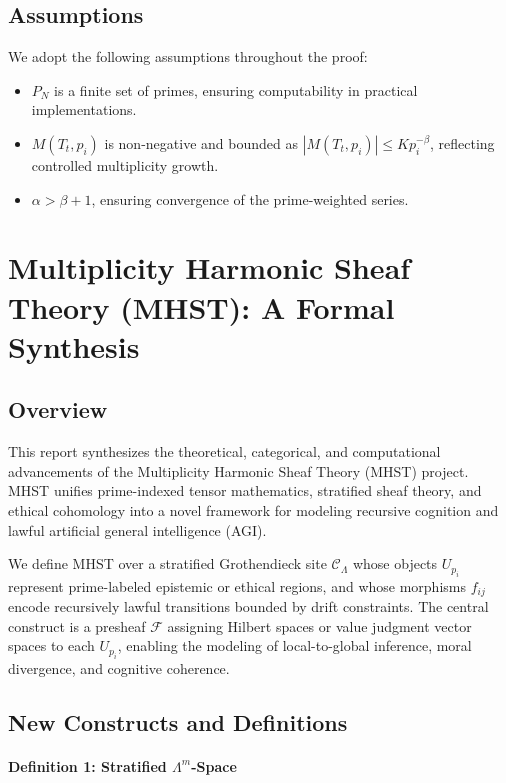 \documentclass{article}
\theoremstyle{plain}
\begin{document}
\subsection{Assumptions}
We adopt the following assumptions throughout the proof:
\begin{itemize}
    \item \( P_N \) is a finite set of primes, ensuring computability in practical implementations.
    \item \( M(T_t, p_i) \) is non-negative and bounded as \( |M(T_t, p_i)| \leq K p_i^{-\beta} \), reflecting controlled multiplicity growth.
    \item \( \alpha > \beta + 1 \), ensuring convergence of the prime-weighted series.
\end{itemize}


\section{Multiplicity Harmonic Sheaf Theory (MHST): A Formal Synthesis}

\subsection{Overview}

This report synthesizes the theoretical, categorical, and computational advancements of the Multiplicity Harmonic Sheaf Theory (MHST) project. MHST unifies prime-indexed tensor mathematics, stratified sheaf theory, and ethical cohomology into a novel framework for modeling recursive cognition and lawful artificial general intelligence (AGI).

We define MHST over a stratified Grothendieck site $\mathcal{C}_\Lambda$ whose objects $U_{p_i}$ represent prime-labeled epistemic or ethical regions, and whose morphisms $f_{ij}$ encode recursively lawful transitions bounded by drift constraints. The central construct is a presheaf $\mathcal{F}$ assigning Hilbert spaces or value judgment vector spaces to each $U_{p_i}$, enabling the modeling of local-to-global inference, moral divergence, and cognitive coherence.

\subsection{New Constructs and Definitions}

\paragraph{Definition 1: Stratified $\Lambda^m$-Space}
\end{document}
